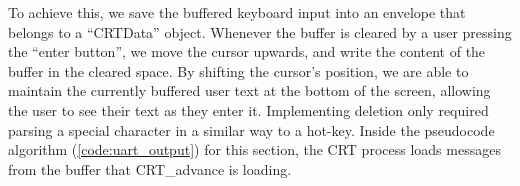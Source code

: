 \documentclass[12pt]{report}
\begin{document}
    To achieve this, we save the buffered keyboard input into an envelope
    that belongs to a ``CRTData'' object. Whenever the buffer is cleared by a
    user pressing the ``enter button'', we move the cursor upwards, and write
    the content of the buffer in the cleared space. By shifting the cursor's %
    position, we are able to maintain the currently buffered user text at the
    bottom of the screen, allowing the user to see their text as they enter it.
    Implementing deletion only required parsing a special character in a similar
    way to a hot-key. Inside the pseudocode algorithm (\ref{code:uart_output})
    for this section, the CRT process loads messages from the buffer that
    CRT_advance is loading.
\end{document}
